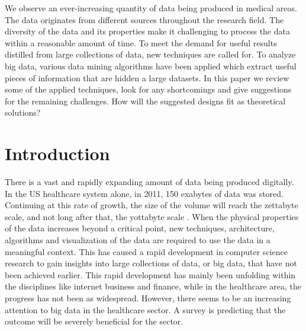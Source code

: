 We observe an ever-increasing quantity of data being produced in medical areas. The data originates from different sources throughout the research field. The diversity of the data and its properties make it challenging to process the data within a reasonable amount of time. To meet the demand for useful results distilled from large collections of data, new techniques are called for. To analyze big data, various data mining algorithms have been applied which extract useful pieces of information that are hidden a large datasets. In this paper we review some of the applied techniques, look for any shortcomings and give suggestions for the remaining challenges. How will the suggested designs fit as theoretical solutions?

\section{Introduction}
There is a vast and rapidly expanding amount of data being produced digitally. In the US healthcare system alone, in 2011, 150 exabytes of data was stored. Continuing at this rate of growth, the size of the volume will reach the zettabyte scale, and not long after that, the yottabyte scale \cite{intro}. 
When the physical properties of the data increases beyond a critical point, new techniques, architecture, algorithms and visualization of the data are required to use the data in a meaningful context. This has caused a rapid development in computer science research to gain insights into large collections of data, or big data, that have not been achieved earlier. This rapid development has mainly been unfolding within the disciplines like internet business and finance, while in the healthcare area, the progress has not been as widespread. However, there seems to be an increasing attention to big data in the healthcare sector. A survey is predicting that the outcome will be severely beneficial for the sector.\cite{gg}

